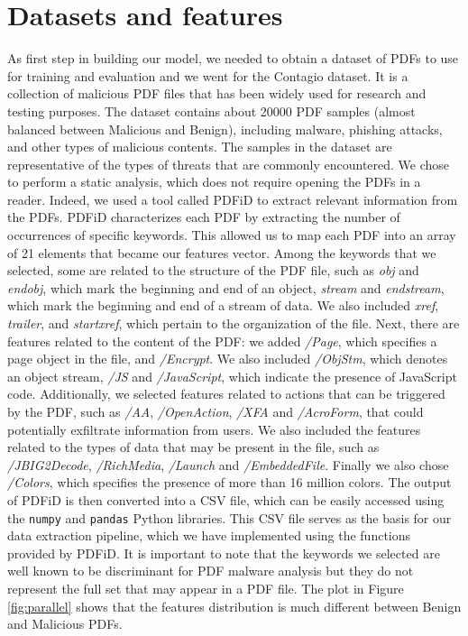 \documentclass[twocolumn, switch]{article} %
\begin{document}
\section{Datasets and features}
\label{sec:datasetsandfeatures}
As first step in building our model, we needed to obtain a dataset of PDFs to use for training and evaluation and we went for the Contagio dataset. It is a collection of malicious PDF files that has been widely used for research and testing purposes. The dataset contains about 20000 PDF samples (almost balanced between Malicious and Benign), including malware, phishing attacks, and other types of malicious contents. The samples in the dataset are representative of the types of threats that are commonly encountered.\newline
We chose to perform a static analysis, which does not require opening the PDFs in a reader. Indeed, we used a tool called PDFiD to extract relevant information from the PDFs. PDFiD characterizes each PDF by extracting the number of occurrences of specific keywords. This allowed us to map each PDF into an array of 21 elements that became our features vector.\newline
Among the keywords that we selected, some are related to the structure of the PDF file, such as \textit{obj} and \textit{endobj}, which mark the beginning and end of an object, \textit{stream} and \textit{endstream}, which mark the beginning and end of a stream of data. We also included \textit{xref}, \textit{trailer}, and \textit{startxref}, which pertain to the organization of the file. Next, there are features related to the content of the PDF: we added \textit{/Page}, which specifies a page object in the file, and \textit{/Encrypt}. We also included \textit{/ObjStm}, which denotes an object stream, \textit{/JS} and \textit{/JavaScript}, which indicate the presence of JavaScript code. Additionally, we selected features related to actions that can be triggered by the PDF, such as \textit{/AA}, \textit{/OpenAction}, \textit{/XFA} and \textit{/AcroForm}, that could potentially exfiltrate information from users. We also included the features related to the types of data that may be present in the file, such as \textit{/JBIG2Decode}, \textit{/RichMedia}, \textit{/Launch} and \textit{/EmbeddedFile}. Finally we also chose \textit{/Colors}, which specifies the presence of more than 16 million colors.\newline
The output of PDFiD is then converted into a CSV file, which can be easily accessed using the \texttt{numpy} and \texttt{pandas} Python libraries. This CSV file serves as the basis for our data extraction pipeline, which we have implemented using the functions provided by PDFiD. It is important to note that the keywords we selected are well known to be discriminant for PDF malware analysis but they do not represent the full set that may appear in a PDF file.\newline
The plot in Figure \ref{fig:parallel} shows that the features distribution is much different between Benign and Malicious PDFs.
\end{document}
